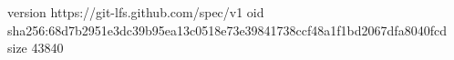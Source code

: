 version https://git-lfs.github.com/spec/v1
oid sha256:68d7b2951e3dc39b95ea13c0518e73e39841738ccf48a1f1bd2067dfa8040fcd
size 43840
